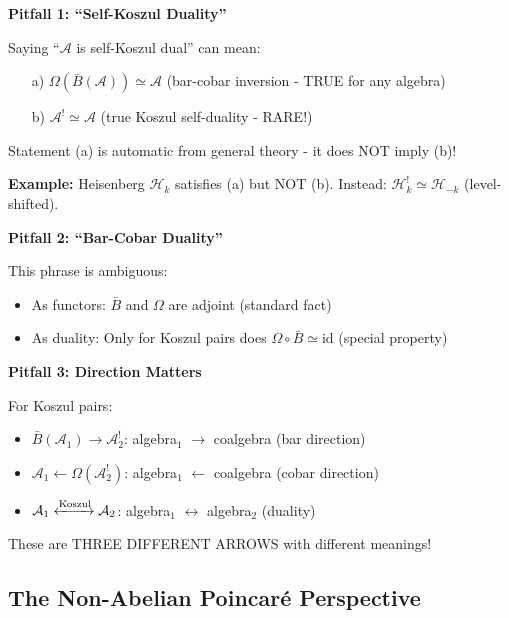 \begin{remark}\label{rem:bar-cobar-confusion}
\textbf{Pitfall 1: ``Self-Koszul Duality''}

Saying ``$\mathcal{A}$ is self-Koszul dual'' can mean:
\begin{enumerate}
\item[a)] $\Omega(\bar{B}(\mathcal{A})) \simeq \mathcal{A}$ (bar-cobar inversion - TRUE for any algebra)
\item[b)] $\mathcal{A}^! \simeq \mathcal{A}$ (true Koszul self-duality - RARE!)
\end{enumerate}

Statement (a) is automatic from general theory - it does NOT imply (b)!

\textbf{Example:} Heisenberg $\mathcal{H}_k$ satisfies (a) but NOT (b). Instead: $\mathcal{H}_k^! \simeq \mathcal{H}_{-k}$ (level-shifted).

\textbf{Pitfall 2: ``Bar-Cobar Duality''}

This phrase is ambiguous:
\begin{itemize}
\item As functors: $\bar{B}$ and $\Omega$ are adjoint (standard fact)
\item As duality: Only for Koszul pairs does $\Omega \circ \bar{B} \simeq \text{id}$ (special property)
\end{itemize}

\textbf{Pitfall 3: Direction Matters}

For Koszul pairs:
\begin{itemize}
\item $\bar{B}(\mathcal{A}_1) \to \mathcal{A}_2^!$: algebra$_1$ $\to$ coalgebra (bar direction)
\item $\mathcal{A}_1 \leftarrow \Omega(\mathcal{A}_2^!)$: algebra$_1$ $\leftarrow$ coalgebra (cobar direction)
\item $\mathcal{A}_1 \xleftrightarrow{\text{Koszul}} \mathcal{A}_2$: algebra$_1$ $\leftrightarrow$ algebra$_2$ (duality)
\end{itemize}

These are THREE DIFFERENT ARROWS with different meanings!
\end{remark}

\subsection{The Non-Abelian Poincaré Perspective}

